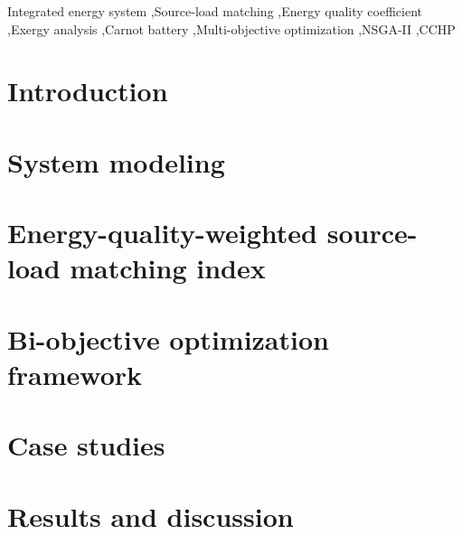 \documentclass[review]{elsarticle}
\begin{document}
\begin{frontmatter}
\begin{keyword}
Integrated energy system \sep Source-load matching \sep Energy quality coefficient \sep Exergy analysis \sep Carnot battery \sep Multi-objective optimization \sep NSGA-II \sep CCHP
\end{keyword}

\end{frontmatter}

\linenumbers

\section{Introduction}
\label{sec:introduction}


\section{System modeling}
\label{sec:system}


\section{Energy-quality-weighted source-load matching index}
\label{sec:matching}


\section{Bi-objective optimization framework}
\label{sec:optimization}


\section{Case studies}
\label{sec:cases}


\section{Results and discussion}
\label{sec:results}


\end{document}
